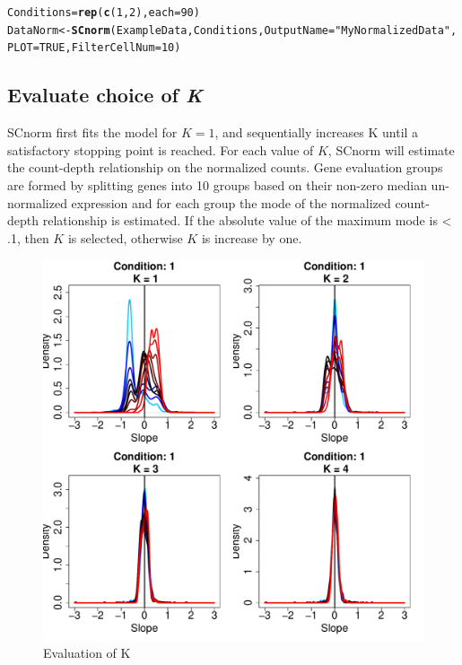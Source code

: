 \documentclass{article}\usepackage[]{graphicx}\usepackage[usenames,dvipsnames]{color}
\makeatletter
\newcommand{\hlnum}[1]{\textcolor[rgb]{0.686,0.059,0.569}{#1}}%
\newcommand{\hlstr}[1]{\textcolor[rgb]{0.192,0.494,0.8}{#1}}%
\newcommand{\hlstd}[1]{\textcolor[rgb]{0.345,0.345,0.345}{#1}}%
\newcommand{\hlkwb}[1]{\textcolor[rgb]{0.69,0.353,0.396}{#1}}%
\newcommand{\hlkwc}[1]{\textcolor[rgb]{0.333,0.667,0.333}{#1}}%
\newcommand{\hlkwd}[1]{\textcolor[rgb]{0.737,0.353,0.396}{\textbf{#1}}}%
\newenvironment{kframe}{%
 \def\at@end@of@kframe{}%
 \ifinner\ifhmode%
  \def\at@end@of@kframe{\end{minipage}}%
  \begin{minipage}{\columnwidth}%
 \fi\fi%
 \def\FrameCommand##1{\hskip\@totalleftmargin \hskip-\fboxsep
 \colorbox{shadecolor}{##1}\hskip-\fboxsep
     \hskip-\linewidth \hskip-\@totalleftmargin \hskip\columnwidth}%
 \MakeFramed {\advance\hsize-\width
   \@totalleftmargin\z@ \linewidth\hsize
   \@setminipage}}%
 {\par\unskip\endMakeFramed%
 \at@end@of@kframe}
\newenvironment{knitrout}{}{} %
\makeatother
\begin{document}
\begin{knitrout}
\color{fgcolor}\begin{kframe}
\begin{alltt}
\hlstd{Conditions} \hlkwb{=} \hlkwd{rep}\hlstd{(}\hlkwd{c}\hlstd{(}\hlnum{1}\hlstd{,}\hlnum{2}\hlstd{),} \hlkwc{each}\hlstd{=} \hlnum{90}\hlstd{)}
\hlstd{DataNorm} \hlkwb{<-} \hlkwd{SCnorm}\hlstd{(ExampleData, Conditions,} \hlkwc{OutputName} \hlstd{=} \hlstr{"MyNormalizedData"}\hlstd{,}
                     \hlkwc{PLOT}\hlstd{=}\hlnum{TRUE}\hlstd{,} \hlkwc{FilterCellNum} \hlstd{=} \hlnum{10}\hlstd{)}
\end{alltt}
\end{kframe}
\end{knitrout}
  



\subsection{Evaluate choice of \textit{K}}
\label{sec:NormalizationK}

SCnorm first fits the model for $K = 1$, and sequentially increases K until a satisfactory stopping point is reached. For each value of $K$, SCnorm will estimate the count-depth relationship on the normalized counts. Gene evaluation groups are formed by splitting genes into 10 groups based on their non-zero median un-normalized expression and for each group the mode of the normalized count-depth relationship is estimated. If the absolute value of the maximum mode is < .1, then $K$ is selected, otherwise $K$ is increase by one.


\begin{figure}[h!]
\centering
\includegraphics[width=.5\textwidth]{MyNormalizedData_k_evaluation.pdf}
\caption{Evaluation of K}
\end{figure}
\end{document}
